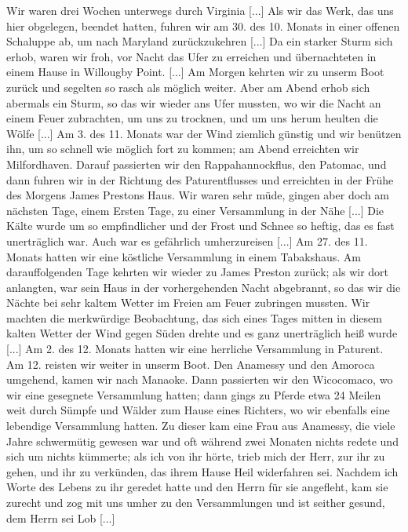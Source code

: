 Wir waren drei Wochen unterwegs durch Virginia [...] Als
wir das Werk, das uns hier obgelegen, beendet hatten, fuhren
wir am 30. des 10. Monats in einer offenen Schaluppe ab, um
nach Maryland zurückzukehren [...] Da ein starker Sturm sich
erhob, waren wir froh, vor Nacht das Ufer zu erreichen und
übernachteten in einem Hause in Willougby Point. [...] 
Am Morgen kehrten wir zu unserm Boot zurück und segelten so rasch
als möglich weiter. Aber am Abend erhob sich abermals ein
Sturm, so das wir wieder ans Ufer mussten, wo wir die Nacht
an einem Feuer zubrachten, um uns zu trocknen, und um uns
herum heulten die Wölfe [...] Am 3. des 11. Monats
war der Wind ziemlich günstig und wir benützen ihn, um so
schnell wie möglich fort zu kommen; am Abend erreichten
wir Milfordhaven. Darauf passierten wir 
den Rappahannockflus, den 
Patomac, und dann fuhren wir in der Richtung
des Paturentflusses und erreichten in der Frühe des Morgens
James Prestons Haus. Wir waren sehr müde, gingen aber
doch am nächsten Tage, einem Ersten Tage, zu einer 
Versammlung in der Nähe [...] Die Kälte wurde um so 
empfindlicher und der Frost und Schnee so heftig, das es fast unerträglich
war. Auch war es gefährlich umherzureisen [...] Am 27. des
11. Monats hatten wir eine köstliche Versammlung in einem
Tabakshaus. Am darauffolgenden Tage kehrten wir wieder zu
James Preston zurück; als wir dort anlangten, war sein Haus
in der vorhergehenden Nacht abgebrannt, so das wir die Nächte
bei sehr kaltem Wetter im Freien am Feuer zubringen mussten.
Wir machten die merkwürdige Beobachtung, das sich eines Tages
mitten in diesem kalten Wetter der Wind gegen Süden drehte
und es ganz unerträglich heiß wurde [...] Am 2. des 12. Monats
hatten wir eine herrliche Versammlung in Paturent. Am 12.
reisten wir weiter in unserm Boot. Den Anamessy und den
Amoroca umgehend, kamen wir nach Manaoke. Dann passierten
wir den Wicocomaco, wo wir eine gesegnete Versammlung hatten;
dann gings zu Pferde etwa 24 Meilen weit durch Sümpfe und
Wälder zum Hause eines Richters, wo wir ebenfalls eine 
lebendige Versammlung hatten. Zu dieser kam eine Frau aus 
Anamessy, die viele Jahre schwermütig 
gewesen war und oft während
zwei Monaten nichts redete und sich um nichts kümmerte; als ich
von ihr hörte, trieb mich der Herr, zur ihr zu gehen, und ihr zu
verkünden, das ihrem Hause Heil widerfahren sei. Nachdem ich
Worte des Lebens zu ihr geredet hatte und den Herrn für sie
angefleht, kam sie zurecht und zog mit uns umher zu den 
Versammlungen und ist seither gesund, dem Herrn sei Lob [...]

